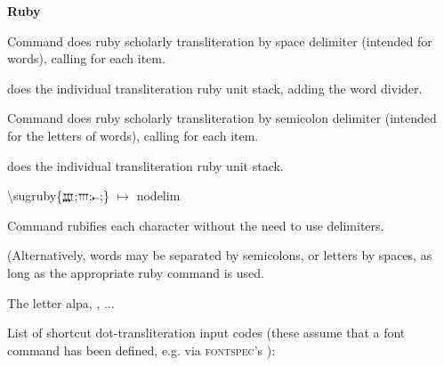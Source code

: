 \documentclass{article}
\begin{document}
\bigskip\textbf{Ruby}

Command \cs{\sugrubyw} does ruby scholarly transliteration by space delimiter (intended for words), calling \cs{\smaprubyw} for each item.

\cs{\smaprubyw} does the individual transliteration ruby unit stack, adding the word divider.



\bigskip
Command \cs{\sugruby} does ruby scholarly transliteration by semicolon delimiter (intended for the letters of words), calling \cs{\smapruby} for each item.

\cs{\smapruby} does the individual transliteration ruby unit stack.

{\ttfamily\color{blue}\textbackslash sugruby\{{\ugfont\scriptsize 𐎄};{\ugfont\scriptsize 𐎍};{\ugfont\scriptsize 𐎚};\}}
\enspace$\mapsto$\enspace
{}nodelim 



\bigskip
Command \cs{\sugrubynd} rubifies each character without the need to use delimiters.

\bigskip
{}

%
%
%

\bigskip
(Alternatively, words may be separated by semicolons, or letters by spaces, as long as the appropriate ruby command is used.

\bigskip
The letter alpa, , ...

\bigskip
List of shortcut dot-transliteration input codes (these assume that a font command \cs{\ugfont} has been defined, e.g. via \textsc{fontspec}'s ):
\end{document}

